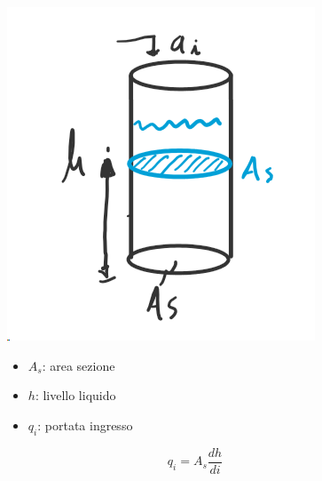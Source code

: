 	\begin{figure}[H]
		\begin{minipage}{.3\textwidth}
			\includegraphics[width=.6\linewidth]{"Images/serbatoiocilindrico.png"}
		\end{minipage}%
		\begin{minipage}{.3\textwidth}
			\begin{itemize}
				\item $ A_s $: area sezione
				\item $ h $: livello liquido
				\item $ q_i $: portata ingresso
			\end{itemize}
		\end{minipage}
		\begin{minipage}{.3\textwidth}
			\centering
			\begin{equation*}
				\boxed{q_i = A_s \dfrac{dh}{di}}
			\end{equation*}
		\end{minipage}
	\end{figure}
	
